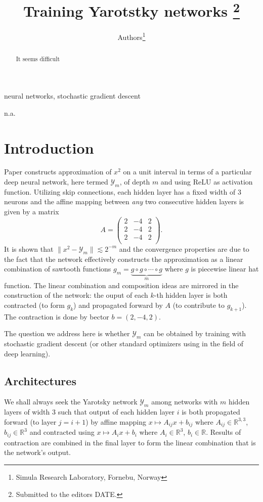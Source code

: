 \documentclass[onetab, a4paper]{siamart171218}
\title{Training Yarotstky networks
  \thanks{Submitted to the editors DATE.
\funding{This work was funded by ...}}
}
\author{Authors\thanks{
    Simula Research Laboratory, Fornebu, Norway}
}
\newcommand{\reals}{{\mathbb{R}}}
\newcommand{\norm}[1]{\lVert#1\rVert}
\theoremstyle{remark}
\begin{document}
\maketitle 
\begin{abstract}
  {
    It seems difficult
}
\end{abstract}

\begin{keywords}
neural networks, stochastic gradient descent
\end{keywords}

\begin{AMS}
n.a.
\end{AMS}

\section{Introduction}

Paper \cite{yarotsky2017error} constructs approximation of $x^2$ on a
unit interval in terms of a particular deep neural network, here termed
$\mathcal{Y}_m$, of depth $m$ and using ReLU as activation function.
Utilizing skip connections, each hidden layer has a fixed width of 3
neurons and the affine mapping between \emph{any} two consecutive hidden
layers is given by a matrix
\[
A = \begin{pmatrix}
  2& -4& 2\\
  2& -4& 2\\
  2& -4& 2\\  
  \end{pmatrix}.
\]
It is shown that $\norm{x^2 - \mathcal{Y}_m} \lesssim 2^{-m}$ and the
convergence properties are due to the fact that the network effectively
constructs the approximation as a linear combination of sawtooth functions
$g_m=\underbrace{g\circ g \circ \cdots \circ g}_{m}$ where $g$ is piecewise
linear hat function. The linear combination and composition ideas are mirrored
in the construction of the network: the ouput of each $k$-th hidden layer is both
contracted (to form $g_k$) and propagated forward by $A$ (to contribute
to $g_{k+1}$). The contraction is done by bector $b=(2, -4, 2)$.

The question we address here is whether $\mathcal{Y}_m$ can be obtained by training with
stochastic gradient descent (or other standard optimizers using in the
field of deep learning).

\subsection{Architectures} We shall always seek the Yarotsky network $\mathcal{Y}_m$
among networks with $m$ hidden layers of width 3 such that output of each hidden
layer $i$ is both propagated forward (to layer $j=i+1$) by affine mapping $x\mapsto A_{ij}x+b_{ij}$ where
$A_{ij}\in\reals^{3, 3}$, $b_{ij}\in\reals^{3}$ and contracted using
$x\mapsto A_{i}x+b_{i}$ where $A_{i}\in\reals^{3}$, $b_{i}\in\reals$.
Results of contraction are combined in the final layer to form the linear
combination that is the network's output.
\end{document}
